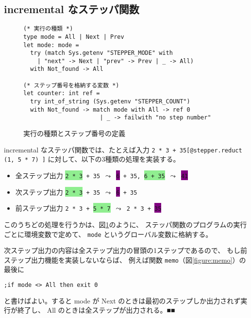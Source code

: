 \subsection{incremental なステッパ関数}

\begin{figure}[t]
\begin{spacing}{0.8}
\begin{verbatim}
(* 実行の種類 *)
type mode = All | Next | Prev
let mode: mode =
  try (match Sys.getenv "STEPPER_MODE" with
    | "next" -> Next | "prev" -> Prev | _ -> All)
  with Not_found -> All

(* ステップ番号を格納する変数 *)
let counter: int ref =
  try int_of_string (Sys.getenv "STEPPER_COUNT")
  with Not_found -> match mode with All -> ref 0
                      | _ -> failwith "no step number"
\end{verbatim}
\end{spacing}
\caption{実行の種類とステップ番号の定義}
\label{figure:mode}
\end{figure}

incremental なステッパ関数では、たとえば入力 \texttt{2 * 3 + 35[@stepper.reduct (1, 5 * 7) ]} に対して、以下の3種類の処理を実装する。

\begin{itemize}
\item 全ステップ出力 \texttt{\colorbox{lightgreen}{2 * 3} + 35 $\leadsto$ \colorbox{purple}{6} + 35, \colorbox{lightgreen}{6 + 35} $\leadsto$ \colorbox{purple}{41}}
\item 次ステップ出力 \texttt{\colorbox{lightgreen}{2 * 3} + 35 $\leadsto$ \colorbox{purple}{6} + 35}
\item 前ステップ出力 \texttt{2 * 3 + \colorbox{lightgreen}{5 * 7} $\leadsto$ 2 * 3 + \colorbox{purple}{35}}
\end{itemize}

このうちどの処理を行うかは、図\ref{figure:mode}のように、
ステッパ関数のプログラムの実行ごとに環境変数で定めて、
\texttt{mode} というグローバル変数に格納する。

次ステップ出力の内容は全ステップ出力の冒頭の1ステップであるので、
もし前ステップ出力機能を実装しないならば、
例えば関数 \texttt{memo}（図\ref{figure:memo}）の最後に
\begin{verbatim}
;if mode <> All then exit 0
\end{verbatim}
と書けばよい。すると mode が Next のときは最初のステップしか出力されず実行が終了し、
All のときは全ステップが出力される。■■

